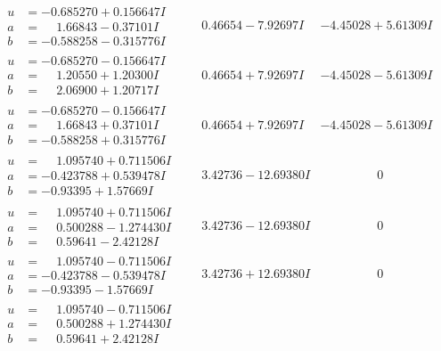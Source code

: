 \documentclass[1p]{elsarticle_modified}
\theoremstyle{definition}
\begin{document}
$$\begin{array}{c|c|c}
\begin{aligned}
u &= -0.685270 + 0.156647 I \\
a &= \phantom{-}1.66843 - 0.37101 I \\
b &= -0.588258 - 0.315776 I\end{aligned}
 & \phantom{-}0.46654 - 7.92697 I & -4.45028 + 5.61309 I \\ \hline\begin{aligned}
u &= -0.685270 - 0.156647 I \\
a &= \phantom{-}1.20550 + 1.20300 I \\
b &= \phantom{-}2.06900 + 1.20717 I\end{aligned}
 & \phantom{-}0.46654 + 7.92697 I & -4.45028 - 5.61309 I \\ \hline\begin{aligned}
u &= -0.685270 - 0.156647 I \\
a &= \phantom{-}1.66843 + 0.37101 I \\
b &= -0.588258 + 0.315776 I\end{aligned}
 & \phantom{-}0.46654 + 7.92697 I & -4.45028 - 5.61309 I \\ \hline\begin{aligned}
u &= \phantom{-}1.095740 + 0.711506 I \\
a &= -0.423788 + 0.539478 I \\
b &= -0.93395 + 1.57669 I\end{aligned}
 & \phantom{-}3.42736 - 12.69380 I & \phantom{-0.000000 } 0 \\ \hline\begin{aligned}
u &= \phantom{-}1.095740 + 0.711506 I \\
a &= \phantom{-}0.500288 - 1.274430 I \\
b &= \phantom{-}0.59641 - 2.42128 I\end{aligned}
 & \phantom{-}3.42736 - 12.69380 I & \phantom{-0.000000 } 0 \\ \hline\begin{aligned}
u &= \phantom{-}1.095740 - 0.711506 I \\
a &= -0.423788 - 0.539478 I \\
b &= -0.93395 - 1.57669 I\end{aligned}
 & \phantom{-}3.42736 + 12.69380 I & \phantom{-0.000000 } 0 \\ \hline\begin{aligned}
u &= \phantom{-}1.095740 - 0.711506 I \\
a &= \phantom{-}0.500288 + 1.274430 I \\
b &= \phantom{-}0.59641 + 2.42128 I\end{aligned}

\end{array}$$
\end{document}
